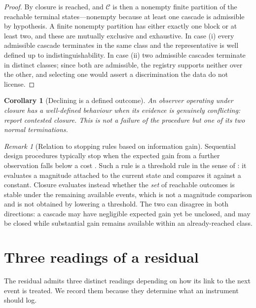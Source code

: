 \documentclass[11pt,a4paper]{article}
\theoremstyle{thmstyle}
\newtheorem{corollary}[theorem]{Corollary}
\theoremstyle{definition}
\theoremstyle{remark}
\newtheorem{remark}[theorem]{Remark}
\begin{document}
\begin{proof}
By  closure is reached, and $\mathcal{C}$ is then a
nonempty finite partition of the reachable terminal states---nonempty
because at least one cascade is admissible by hypothesis. A finite nonempty
partition has either exactly one block or at least two, and these are
mutually exclusive and exhaustive. In case (i) every admissible cascade
terminates in the same class and the representative is well defined up to
indistinguishability. In case (ii) two admissible cascades terminate in
distinct classes; since both are admissible, the registry supports neither
over the other, and selecting one would assert a discrimination the data do
not license.
\end{proof}

\begin{corollary}[Declining is a defined outcome]
\label{cor:decline}
An observer operating under closure has a well-defined behaviour when its
evidence is genuinely conflicting: report contested closure. This is not a
failure of the procedure but one of its two normal terminations.
\end{corollary}

\begin{remark}[Relation to stopping rules based on information gain]
\label{rem:stopping}
Sequential design procedures typically stop when the expected gain from a
further observation falls below a cost \citep{lindley1956,chaloner1995}.
Such a rule is a threshold rule in the sense of
: it evaluates a magnitude attached to the
current state and compares it against a constant. Closure evaluates instead
whether the \emph{set} of reachable outcomes is stable under the remaining
available events, which is not a magnitude comparison and is not obtained by
lowering a threshold. The two can disagree in both directions: a cascade may
have negligible expected gain yet be unclosed, and may be closed while
substantial gain remains available within an already-reached class.
\end{remark}

\section{Three readings of a residual}
\label{sec:interpretation}

The residual admits three distinct readings depending on how its link to the
next event is treated. We record them because they determine what an
instrument should log.
\end{document}
